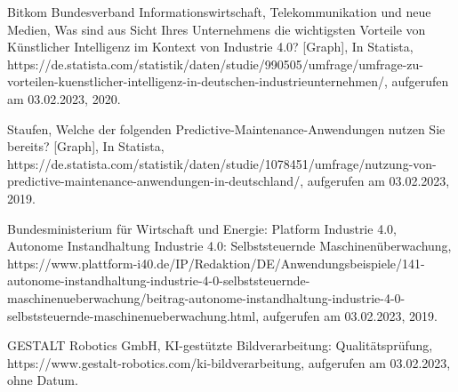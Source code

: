 \begin{thebibliography}{99}
	Bitkom Bundesverband Informationswirtschaft, Telekommunikation und neue Medien,
	Was sind aus Sicht Ihres Unternehmens die wichtigsten Vorteile von Künstlicher Intelligenz im Kontext von Industrie 4.0? [Graph],
	In Statista,
	https://de.statista.com/statistik/daten/studie/990505/umfrage/umfrage-zu-vorteilen-kuenstlicher-intelligenz-in-deutschen-industrieunternehmen/,
	aufgerufen am 03.02.2023,
	2020.

	Staufen,
	Welche der folgenden Predictive-Maintenance-Anwendungen nutzen Sie bereits? [Graph],
	In Statista,
	https://de.statista.com/statistik/daten/studie/1078451/umfrage/nutzung-von-predictive-maintenance-anwendungen-in-deutschland/,
	aufgerufen am 03.02.2023,
	2019.

	Bundesministerium für Wirtschaft und Energie: Platform Industrie 4.0,
	Autonome Instandhaltung Industrie 4.0: Selbststeuernde Maschinenüberwachung,
	https://www.plattform-i40.de/IP/Redaktion/DE/Anwendungsbeispiele/141-autonome-instandhaltung-industrie-4-0-selbststeuernde-maschinenueberwachung/beitrag-autonome-instandhaltung-industrie-4-0-selbststeuernde-maschinenueberwachung.html,
	aufgerufen am 03.02.2023,
	2019.

	GESTALT Robotics GmbH,
	KI-gestützte Bildverarbeitung: Qualitätsprüfung, 
	https://www.gestalt-robotics.com/ki-bildverarbeitung, 
	aufgerufen am 03.02.2023,
	ohne Datum.

\end{thebibliography}